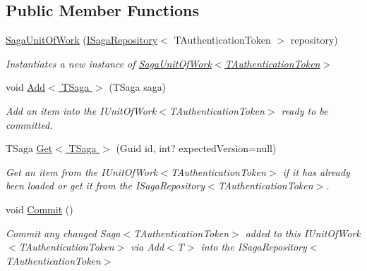 \subsection*{Public Member Functions}
\begin{DoxyCompactItemize}
\item 
\hyperlink{classCqrs_1_1Domain_1_1SagaUnitOfWork_ae2340d3bc97745c71d4854cb24115e93_ae2340d3bc97745c71d4854cb24115e93}{Saga\+Unit\+Of\+Work} (\hyperlink{interfaceCqrs_1_1Domain_1_1ISagaRepository}{I\+Saga\+Repository}$<$ T\+Authentication\+Token $>$ repository)
\begin{DoxyCompactList}\small\item\em Instantiates a new instance of \hyperlink{classCqrs_1_1Domain_1_1SagaUnitOfWork_ae2340d3bc97745c71d4854cb24115e93_ae2340d3bc97745c71d4854cb24115e93}{Saga\+Unit\+Of\+Work$<$\+T\+Authentication\+Token$>$} \end{DoxyCompactList}\item 
void \hyperlink{classCqrs_1_1Domain_1_1SagaUnitOfWork_af62fee98e76ec58ec4d684b36eb7b20e_af62fee98e76ec58ec4d684b36eb7b20e}{Add$<$ T\+Saga $>$} (T\+Saga saga)
\begin{DoxyCompactList}\small\item\em Add an item into the I\+Unit\+Of\+Work$<$\+T\+Authentication\+Token$>$ ready to be committed. \end{DoxyCompactList}\item 
T\+Saga \hyperlink{classCqrs_1_1Domain_1_1SagaUnitOfWork_acebe159e3b27e36a91909e97cf37d28d_acebe159e3b27e36a91909e97cf37d28d}{Get$<$ T\+Saga $>$} (Guid id, int? expected\+Version=null)
\begin{DoxyCompactList}\small\item\em Get an item from the I\+Unit\+Of\+Work$<$\+T\+Authentication\+Token$>$ if it has already been loaded or get it from the I\+Saga\+Repository$<$\+T\+Authentication\+Token$>$. \end{DoxyCompactList}\item 
void \hyperlink{classCqrs_1_1Domain_1_1SagaUnitOfWork_aed2756dadfe0a0903a791944d02c4db8_aed2756dadfe0a0903a791944d02c4db8}{Commit} ()
\begin{DoxyCompactList}\small\item\em Commit any changed Saga$<$\+T\+Authentication\+Token$>$ added to this I\+Unit\+Of\+Work$<$\+T\+Authentication\+Token$>$ via Add$<$\+T$>$ into the I\+Saga\+Repository$<$\+T\+Authentication\+Token$>$ \end{DoxyCompactList}\end{DoxyCompactItemize}


